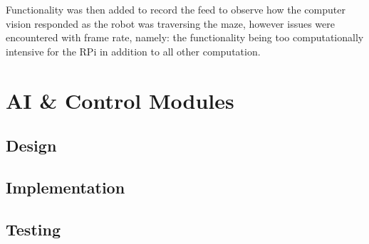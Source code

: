 Functionality was then added to record the feed to observe how the computer vision responded as
the robot was traversing the maze, however issues were encountered with frame rate, namely: the functionality being too
computationally intensive for the RPi in addition to all other computation.


\section{AI \& Control Modules}\label{soft/ai}

\subsection{Design}\label{soft/ai/design}

\subsection{Implementation}\label{soft/ai/impl}

\subsection{Testing}\label{soft/ai/test}

